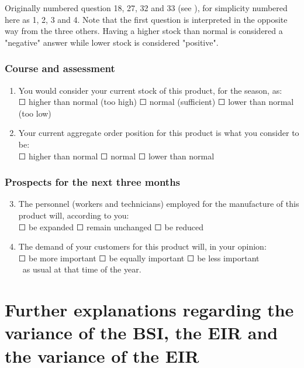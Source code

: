 \documentclass[12pt,a4paper,oneside]{book}
\begin{document}
Originally numbered question 18, 27, 32 and 33 (see ), for simplicity numbered here as 1, 2, 3 and 4.
Note that the first question is interpreted in the opposite way from the three others. Having a higher stock than normal is considered a "negative" answer while lower stock is considered "positive".


\subsubsection*{Course and assessment}
\begin{enumerate}
    \item You would consider your current stock of this product, for the season, as: \\
    $\Square$ higher than normal (too high) $\Square$ normal (sufficient) $\Square$ lower than normal (too low)
    
    \item Your current aggregate order position for this product is what you consider to be: \\
    $\Square$ higher than normal $\Square$ normal $\Square$ lower than normal
\end{enumerate}

\subsubsection*{Prospects for the next three months} 
\begin{enumerate}
\setcounter{enumi}{2}
    \item The personnel (workers and technicians) employed for the manufacture of this product will, according to you: \\
    $\Square$ be expanded $\Square$ remain unchanged $\Square$ be reduced
                        
    \item The demand of your customers for this product will, in your opinion:  \\
    $\Square$ be more important $\Square$ be equally important $\Square$ be less important \\\    
    as usual at that time of the year.
\end{enumerate}





\newpage
\section{Further explanations regarding the variance of the BSI, the EIR and the variance  of the EIR}
\label{chap:appendix:explain Var BSI and EIR}
\end{document}
